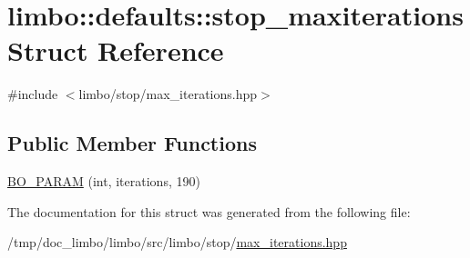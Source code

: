 \hypertarget{structlimbo_1_1defaults_1_1stop__maxiterations}{}\section{limbo\+:\+:defaults\+:\+:stop\+\_\+maxiterations Struct Reference}
\label{structlimbo_1_1defaults_1_1stop__maxiterations}


{\ttfamily \#include $<$limbo/stop/max\+\_\+iterations.\+hpp$>$}

\subsection*{Public Member Functions}
\begin{DoxyCompactItemize}
\item 
\hyperlink{group__stop__defaults_ga87b011bd30622aa8b333b0d3452412ad}{B\+O\+\_\+\+P\+A\+R\+A\+M} (int, iterations, 190)
\end{DoxyCompactItemize}


The documentation for this struct was generated from the following file\+:\begin{DoxyCompactItemize}
\item 
/tmp/doc\+\_\+limbo/limbo/src/limbo/stop/\hyperlink{max__iterations_8hpp}{max\+\_\+iterations.\+hpp}\end{DoxyCompactItemize}

